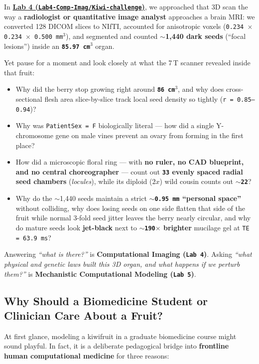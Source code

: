 \documentclass[10pt,a4paper]{article}
\newcommand{\ghblob}{https://github.com/arvidl/BMED365-2027/blob/main}
\begin{document}
In \href{\ghblob/Lab4-Comp-Imag/Kiwi-challenge/README.md}{\textbf{Lab 4 (\texttt{Lab4-Comp-Imag/Kiwi-challenge})}}, we approached that 3D scan the way a \textbf{radiologist or quantitative image analyst} approaches a brain MRI: we converted 128 DICOM slices to NIfTI, accounted for anisotropic voxels (\texttt{0.234 $\times$ 0.234 $\times$ 0.500\,mm$^3$}), and segmented and counted \textbf{$\sim$1,440 dark seeds} (``focal lesions'') inside an \textbf{\texttt{85.97\,cm$^3$}} organ.

Yet pause for a moment and look closely at what the 7\,T scanner revealed inside that fruit:
\begin{itemize}
    \item Why did the berry stop growing right around \textbf{\texttt{86\,cm$^3$}}, and why does cross-sectional flesh area slice-by-slice track local seed density so tightly (\texttt{r = 0.85--0.94})?
    \item Why was \texttt{PatientSex = F} biologically literal --- how did a single Y-chromosome gene on male vines prevent an ovary from forming in the first place?
    \item How did a microscopic floral ring --- with \textbf{no ruler, no CAD blueprint, and no central choreographer} --- count out \textbf{\texttt{33} evenly spaced radial seed chambers} (\textit{locules}), while its diploid ($2x$) wild cousin counts out \textbf{\texttt{$\sim$22}}?
    \item Why do the $\sim$1,440 seeds maintain a strict \textbf{\texttt{$\sim$0.95\,mm} ``personal space''} without colliding, why does losing seeds on one side flatten that side of the fruit while normal 3-fold seed jitter leaves the berry nearly circular, and why do mature seeds look \textbf{jet-black} next to \textbf{\texttt{$\sim$190$\times$} brighter} mucilage gel at \texttt{TE = 63.9\,ms}?
\end{itemize}

Answering \textit{``what is there?''} is \textbf{Computational Imaging (\texttt{Lab 4})}. Asking \textit{``what physical and genetic laws built this 3D organ, and what happens if we perturb them?''} is \textbf{Mechanistic Computational Modeling (\texttt{Lab 5})}.

\subsection{Why Should a Biomedicine Student or Clinician Care About a Fruit?}

At first glance, modeling a kiwifruit in a graduate biomedicine course might sound playful. In fact, it is a deliberate pedagogical bridge into \textbf{frontline human computational medicine} for three reasons:
\end{document}
